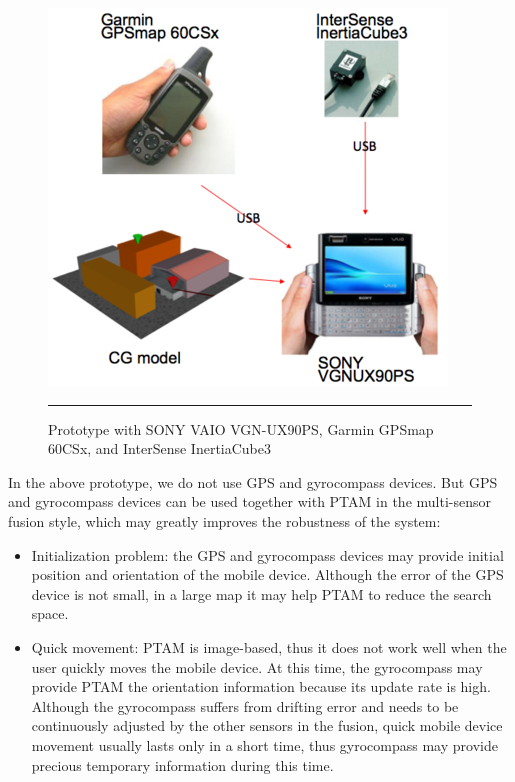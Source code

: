 \begin{figure}[htbp]
	\centering
	\includegraphics{./Primitives/vaio_gps_gyro.png}
	\rule{35em}{0.5pt}
	\caption[Prototype with SONY VAIO VGN-UX90PS, Garmin GPSmap 60CSx, and InterSense InertiaCube3]{Prototype with SONY VAIO VGN-UX90PS, Garmin GPSmap 60CSx, and InterSense InertiaCube3}
	\label{fig:VAIOGPSGyro}
\end{figure}

In the above prototype, we do not use GPS and gyrocompass devices. But GPS and gyrocompass devices can be used together with PTAM in the multi-sensor fusion \citep{Reference14} style, which may greatly improves the robustness of the system:

\begin{itemize}
	\item Initialization problem: the GPS and gyrocompass devices may provide initial position and orientation of the mobile device. Although the error of the GPS device is not small, in a large map it may help PTAM to reduce the search space.
	\item Quick movement: PTAM is image-based, thus it does not work well when the user quickly moves the mobile device. At this time, the gyrocompass may provide PTAM the orientation information because its update rate is high. Although the gyrocompass suffers from drifting error and needs to be continuously adjusted by the other sensors in the fusion, quick mobile device movement usually lasts only in a short time, thus gyrocompass may provide precious temporary information during this time.
\end{itemize}

